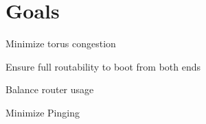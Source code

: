 \section{Goals}

Minimize torus congestion

Ensure full routability to boot from both ends

Balance router usage

Minimize Pinging

